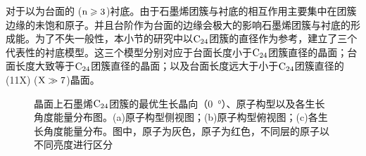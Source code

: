 对于以为台面的 ($\rm{n \geqslant 3}$)衬底。由于石墨烯团簇与衬底的相互作用主要集中在团簇边缘的未饱和原子。并且台阶作为台面的边缘会极大的影响石墨烯团簇与衬底的形成能。为了不失一般性，本小节的研究中以$\rm{C_{24}}$团簇的直径作为参考，建立了三个代表性的衬底模型。这三个模型分别对应于台面长度小于$\rm{C_{24}}$团簇直径的晶面；台面长度大致等于$\rm{C_{24}}$团簇直径的晶面；以及台面长度远大于小于$\rm{C_{24}}$团簇直径的(11X) ($\rm X \gg 7 $)晶面。

\begin{figure}[!b]
    \centering
\end{figure}
\begin{figure}\ContinuedFloat
    \caption{晶面上石墨烯$\rm{C_{24}}$团簇的最优生长晶向（\SI{0}{\degree}）、原子构型以及各生长角度能量分布图。(a)原子构型侧视图；(b)原子构型俯视图；(c)各生长角度能量分布。图中，原子为灰色，原子为红色，不同层的原子以不同亮度进行区分}
    \label{fig:GO_C24_11X}
\end{figure}

